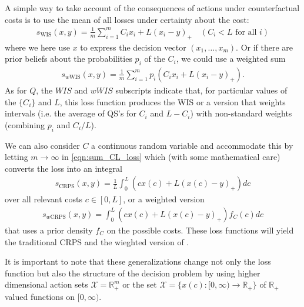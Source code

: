 \documentclass{article}
\begin{document}
A simple way to take account of the consequences of actions under counterfactual costs is to use the mean of all losses under certainty about the cost:
\begin{align}
s_{\mathrm{WIS}}(x,y) = \frac{1}{m}\sum_{i=1}^{m}C_ix_i + L(x_i - y)_+ \quad (C_i < L \text{ for all } i)
\end{align}
where we here use $x$ to express the decision vector $(x_1,\ldots, x_m)$. Or if there are prior beliefs about the probabilities $p_i$ of the $C_i$, we could use a weighted sum
\begin{align}
s_{w\mathrm{WIS}}(x,y) = \frac{1}{m}\sum_{i=1}^{m}p_i(C_ix_i + L(x_i - y)_+). \label{eqn:sum_CL_loss}
\end{align}
As for $Q$, the $WIS$ and $wWIS$ subscripts indicate that, for particular values of the $\{C_i\}$ and $L$, this loss function produces the WIS or a version that weights intervals (i.e. the average of QS's for $C_i$ and $L-C_i$) with non-standard weights (combining $p_i$ and $C_i/L$).

We can also consider $C$ a continuous random variable and accommodate this by letting $m \to \infty$ in \eqref{eqn:sum_CL_loss} which (with some mathematical care) converts the loss into an integral
\begin{align}
s_{\mathrm{CRPS}}(x,y) = \frac{1}{L}\int_{0}^{L} (cx(c) + L(x(c) - y)_+) dc
\end{align}
over all relevant costs $c \in [0,L]$, or a weighted version
\begin{align}
s_{w\mathrm{CRPS}}(x,y) = \int_{0}^{L} (cx(c) + L(x(c) - y)_+) f_C(c)dc{}
\end{align}
that uses a prior density $f_C$ on the possible costs. These loss functions will yield the traditional CRPS and the wieghted version of \cite{gneiting2011weightedScoringRules}.

It is important to note that these generalizations change not only the loss function but also the structure of the decision problem by using higher dimensional action sets $\mathcal{X}= \mathbb{R}_+^m$ or the set $\mathcal{X} = \{x(c):[0,\infty) \to \mathbb{R}_+\}$ of $\mathbb{R}_+$ valued functions  on $[0,\infty)$. 
\end{document}
